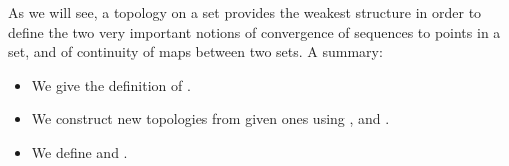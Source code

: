 \documentclass{article}
\begin{document}
As we will see, a topology on a set provides the weakest structure in order to define the two very important notions of convergence of sequences to points in a set, and of continuity of maps between two sets. 
A summary:
\begin{itemize}[$\blacktriangleright$]
\item We give the definition of .
\item We construct new topologies from given ones using ,  and .
\item We define  and .
\end{itemize}
\end{document}
